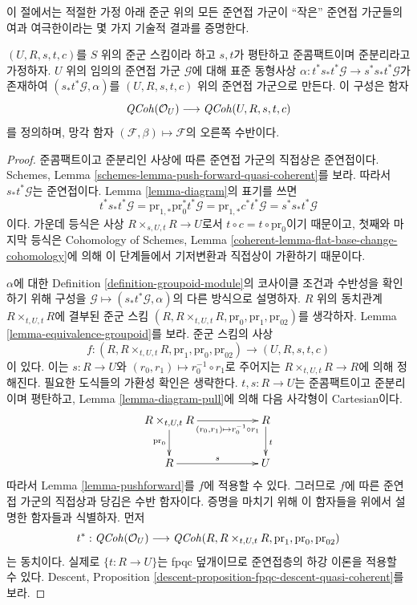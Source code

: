 \noindent
이 절에서는 적절한 가정 아래 준군 위의 모든 준연접 가군이 ``작은'' 준연접 가군들의 여과 여극한이라는 몇 가지 기술적 결과를 증명한다.

\begin{lemma}
\label{lemma-construct-quasi-coherent}
$(U, R, s, t, c)$를 $S$ 위의 준군 스킴이라 하고 $s, t$가 평탄하고 준콤팩트이며 준분리라고 가정하자.
$U$ 위의 임의의 준연접 가군 $\mathcal{G}$에 대해 표준 동형사상
$\alpha : t^*s_*t^*\mathcal{G} \to s^*s_*t^*\mathcal{G}$가 존재하여 $(s_*t^*\mathcal{G}, \alpha)$를
$(U, R, s, t, c)$ 위의 준연접 가군으로 만든다. 이 구성은 함자
$$
\mathit{QCoh}(\mathcal{O}_U) \longrightarrow \mathit{QCoh}(U, R, s, t, c)
$$
를 정의하며, 망각 함자 $(\mathcal{F}, \beta) \mapsto \mathcal{F}$의 오른쪽 수반이다.
\end{lemma}

\begin{proof}
준콤팩트이고 준분리인 사상에 따른 준연접 가군의 직접상은 준연접이다. Schemes, Lemma
\ref{schemes-lemma-push-forward-quasi-coherent}를 보라. 따라서 $s_*t^*\mathcal{G}$는 준연접이다.
Lemma \ref{lemma-diagram}의 표기를 쓰면
$$
t^*s_*t^*\mathcal{G} =
\text{pr}_{1, *}\text{pr}_0^*t^*\mathcal{G} =
\text{pr}_{1, *}c^*t^*\mathcal{G} =
s^*s_*t^*\mathcal{G}
$$
이다. 가운데 등식은 사상 $R \times_{s, U, t} R \to U$로서 $t \circ c = t \circ \text{pr}_0$이기 때문이고,
첫째와 마지막 등식은 Cohomology of Schemes, Lemma
\ref{coherent-lemma-flat-base-change-cohomology}에 의해 이 단계들에서 기저변환과 직접상이 가환하기 때문이다.

\medskip\noindent
$\alpha$에 대한 Definition \ref{definition-groupoid-module}의 코사이클 조건과 수반성을 확인하기 위해 구성을
$\mathcal{G} \mapsto (s_*t^*\mathcal{G}, \alpha)$의 다른 방식으로 설명하자. $R$ 위의 동치관계
$R \times_{t, U, t} R$에 결부된 준군 스킴
$(R, R \times_{t, U, t} R, \text{pr}_0, \text{pr}_1, \text{pr}_{02})$를 생각하자.
Lemma \ref{lemma-equivalence-groupoid}를 보라. 준군 스킴의 사상
$$
f :
(R, R \times_{t, U, t} R, \text{pr}_1, \text{pr}_0, \text{pr}_{02})
\longrightarrow
(U, R, s, t, c)
$$
이 있다. 이는 $s : R \to U$와 $(r_0, r_1) \mapsto r_0^{-1} \circ r_1$로 주어지는
$R \times_{t, U, t} R \to R$에 의해 정해진다. 필요한 도식들의 가환성 확인은 생략한다.
$t, s : R \to U$는 준콤팩트이고 준분리이며 평탄하고, Lemma \ref{lemma-diagram-pull}에 의해 다음 사각형이 Cartesian이다.
$$
\xymatrix{
R \times_{t, U, t} R \ar[d]_{\text{pr}_0}
\ar[rr]_-{(r_0, r_1) \mapsto r_0^{-1} \circ r_1} & & R \ar[d]^t \\
R \ar[rr]^s & & U
}
$$
따라서 Lemma \ref{lemma-pushforward}를 $f$에 적용할 수 있다. 그러므로 $f$에 따른 준연접 가군의 직접상과 당김은
수반 함자이다. 증명을 마치기 위해 이 함자들을 위에서 설명한 함자들과 식별하자. 먼저
$$
t^* :
\mathit{QCoh}(\mathcal{O}_U)
\longrightarrow
\mathit{QCoh}(R, R \times_{t, U, t} R, \text{pr}_1, \text{pr}_0, \text{pr}_{02})
$$
는 동치이다. 실제로 $\{t : R \to U\}$는 fpqc 덮개이므로 준연접층의 하강 이론을 적용할 수 있다.
Descent, Proposition \ref{descent-proposition-fpqc-descent-quasi-coherent}를 보라.


\end{proof}
